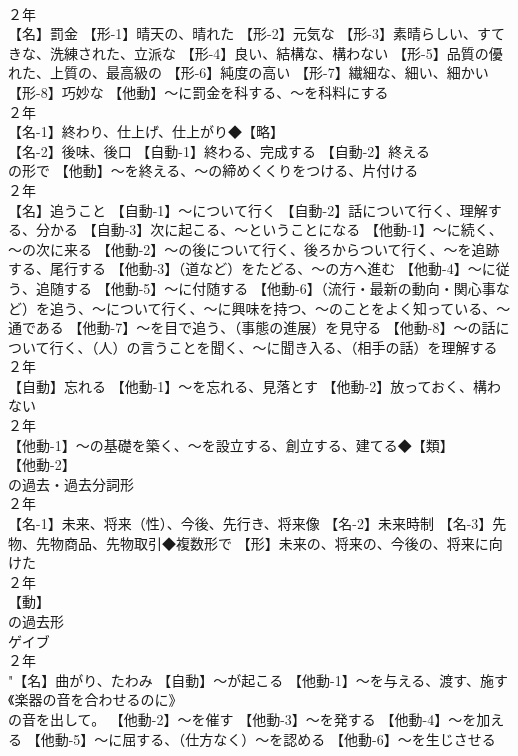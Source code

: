 \documentclass[8pt]{extreport}
\begin{document}
\begin{CJK}{UTF8}{min}
\\	２年	
\\	【名】罰金 【形-1】晴天の、晴れた 【形-2】元気な 【形-3】素晴らしい、すてきな、洗練された、立派な 【形-4】良い、結構な、構わない 【形-5】品質の優れた、上質の、最高級の 【形-6】純度の高い 【形-7】繊細な、細い、細かい 【形-8】巧妙な 【他動】～に罰金を科する、～を科料にする
\\	２年	
\\	【名-1】終わり、仕上げ、仕上がり◆【略】
\\	【名-2】後味、後口 【自動-1】終わる、完成する 【自動-2】終える
\\	の形で 【他動】～を終える、～の締めくくりをつける、片付ける
\\	２年	
\\	【名】追うこと 【自動-1】～について行く 【自動-2】話について行く、理解する、分かる 【自動-3】次に起こる、～ということになる 【他動-1】～に続く、～の次に来る 【他動-2】～の後について行く、後ろからついて行く、～を追跡する、尾行する 【他動-3】（道など）をたどる、～の方へ進む 【他動-4】～に従う、追随する 【他動-5】～に付随する 【他動-6】（流行・最新の動向・関心事など）を追う、～について行く、～に興味を持つ、～のことをよく知っている、～通である 【他動-7】～を目で追う、（事態の進展）を見守る 【他動-8】～の話について行く、（人）の言うことを聞く、～に聞き入る、（相手の話）を理解する
\\	２年	
\\	【自動】忘れる 【他動-1】～を忘れる、見落とす 【他動-2】放っておく、構わない
\\	２年	
\\	【他動-1】～の基礎を築く、～を設立する、創立する、建てる◆【類】
\\	【他動-2】
\\	の過去・過去分詞形
\\	２年	
\\	【名-1】未来、将来（性）、今後、先行き、将来像 【名-2】未来時制 【名-3】先物、先物商品、先物取引◆複数形で 【形】未来の、将来の、今後の、将来に向けた
\\	２年	
\\	【動】
\\	の過去形 
\\	ゲイブ
\\	２年	
\\	"【名】曲がり、たわみ 【自動】～が起こる 【他動-1】～を与える、渡す、施す 
\\	《楽器の音を合わせるのに》
\\	の音を出して。 【他動-2】～を催す 【他動-3】～を発する 【他動-4】～を加える 【他動-5】～に屈する、（仕方なく）～を認める 【他動-6】～を生じさせる

\end{CJK}
\end{document}
